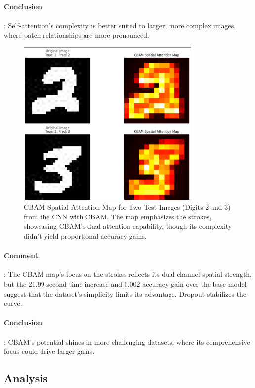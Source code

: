 \documentclass[12pt]{article}
\begin{document}
    \paragraph{Conclusion}: Self-attention's complexity is better suited to larger, more complex images, where patch relationships are more pronounced.
\begin{figure}[H]
    \centering
    \includegraphics[width=0.8\textwidth]{cbam_attention_maps.png}
    \caption{CBAM Spatial Attention Map for Two Test Images (Digits 2 and 3) from the CNN with CBAM. The map emphasizes the strokes, showcasing CBAM's dual attention capability, though its complexity didn't yield proportional accuracy gains.}
    \label{fig:cbam_attention_maps}

\end{figure}
    \paragraph{Comment}: The CBAM map's focus on the strokes reflects its dual channel-spatial strength, but the 21.99-second time increase and 0.002 accuracy gain over the base model suggest that the dataset's simplicity limits its advantage. Dropout stabilizes the curve.
    \paragraph{Conclusion}: CBAM's potential shines in more challenging datasets, where its comprehensive focus could drive larger gains.

\subsection{Analysis}
\end{document}
